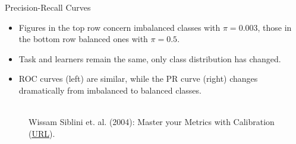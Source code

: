 \begin{vbframe}{Precision-Recall Curves}
\begin{footnotesize}
\vspace{-0.2cm}
\begin{itemize}
  \item Figures in the top row concern imbalanced classes with $\pi = 0.003$, 
  those in the bottom row balanced ones with $\pi = 0.5$.
  \item Task and learners remain the same, only class distribution has changed.
  \item ROC curves (left) are similar, while the PR curve (right) changes 
  dramatically from imbalanced to balanced classes. 
\end{itemize}

\end{footnotesize}


\begin{figure}
  \centering
  \tiny
  \\ Wissam Siblini et. al. (2004): Master your Metrics with Calibration 
  (\href{https://arxiv.org/pdf/1909.02827.pdf}{\underline{URL}}).
\end{figure}


\end{vbframe}
